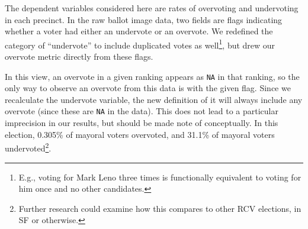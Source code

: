 \documentclass[12pt,twoside]{reedthesis}
\begin{document}
The dependent variables considered here are rates of overvoting and undervoting in each precinct. In the raw ballot image data, two fields are flags indicating whether a voter had either an undervote or an overvote. We redefined the category of ``undervote'' to include duplicated votes as well\footnote{E.g., voting for Mark Leno three times is functionally equivalent to voting for him once and no other candidates.}, but drew our overvote metric directly from these flags.
\begin{table}[t]

\caption{\label{tab:unnamed-chunk-3}Processed Ballot Image}
\centering
{}
\end{table}
In this view, an overvote in a given ranking appears as \texttt{NA} in that ranking, so the only way to observe an overvote from this data is with the given flag. Since we recalculate the undervote variable, the new definition of it will always include any overvote (since these are \texttt{NA} in the data). This does not lead to a particular imprecision in our results, but should be made note of conceptually. In this election, 0.305\% of mayoral voters overvoted, and 31.1\% of mayoral voters undervoted\footnote{Further research could examine how this compares to other RCV elections, in SF or otherwise.}.
\end{document}
